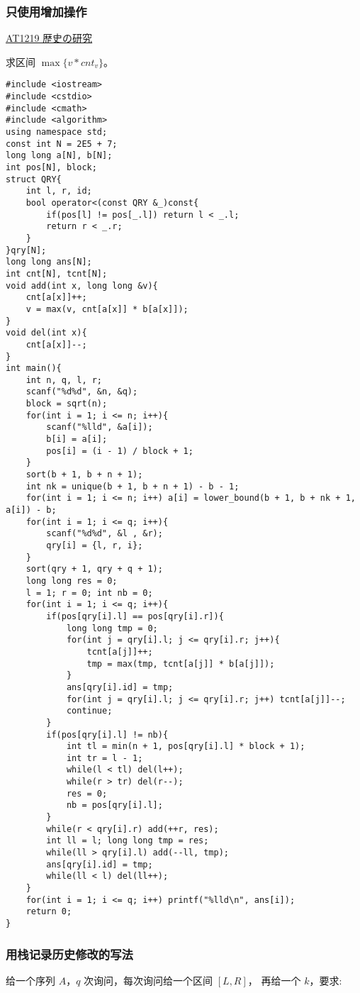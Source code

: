 \subsubsection{只使用增加操作}
	\href{https://www.luogu.com.cn/problem/AT1219}{AT1219 歴史の研究} \par
	求区间 $\max\{v * cnt_v\}$​。
	\begin{lstlisting}
#include <iostream>
#include <cstdio>
#include <cmath>
#include <algorithm>
using namespace std;
const int N = 2E5 + 7;
long long a[N], b[N];
int pos[N], block;
struct QRY{
    int l, r, id;
    bool operator<(const QRY &_)const{
        if(pos[l] != pos[_.l]) return l < _.l;
        return r < _.r;
    }
}qry[N];
long long ans[N];
int cnt[N], tcnt[N];
void add(int x, long long &v){
    cnt[a[x]]++;
    v = max(v, cnt[a[x]] * b[a[x]]);
}
void del(int x){
    cnt[a[x]]--;
}
int main(){
    int n, q, l, r;
    scanf("%d%d", &n, &q);
    block = sqrt(n);
    for(int i = 1; i <= n; i++){
        scanf("%lld", &a[i]);
        b[i] = a[i];
        pos[i] = (i - 1) / block + 1;
    }
    sort(b + 1, b + n + 1);
    int nk = unique(b + 1, b + n + 1) - b - 1;
    for(int i = 1; i <= n; i++) a[i] = lower_bound(b + 1, b + nk + 1, a[i]) - b;
    for(int i = 1; i <= q; i++){
        scanf("%d%d", &l , &r);
        qry[i] = {l, r, i};
    }
    sort(qry + 1, qry + q + 1);
    long long res = 0;
    l = 1; r = 0; int nb = 0;
    for(int i = 1; i <= q; i++){
        if(pos[qry[i].l] == pos[qry[i].r]){
            long long tmp = 0;
            for(int j = qry[i].l; j <= qry[i].r; j++){
                tcnt[a[j]]++;
                tmp = max(tmp, tcnt[a[j]] * b[a[j]]);
            }
            ans[qry[i].id] = tmp;
            for(int j = qry[i].l; j <= qry[i].r; j++) tcnt[a[j]]--;
            continue;
        }
        if(pos[qry[i].l] != nb){
            int tl = min(n + 1, pos[qry[i].l] * block + 1);
            int tr = l - 1;
            while(l < tl) del(l++);
            while(r > tr) del(r--);
            res = 0;
            nb = pos[qry[i].l];
        }
        while(r < qry[i].r) add(++r, res);
        int ll = l; long long tmp = res;
        while(ll > qry[i].l) add(--ll, tmp);
        ans[qry[i].id] = tmp;
        while(ll < l) del(ll++);
    }
    for(int i = 1; i <= q; i++) printf("%lld\n", ans[i]);
    return 0;
}\end{lstlisting}

\subsubsection{用栈记录历史修改的写法}
	给一个序列 $A$，$q$ 次询问，每次询问给一个区间 $[L,R]$， 再给一个 $k$，要求: \par
	

